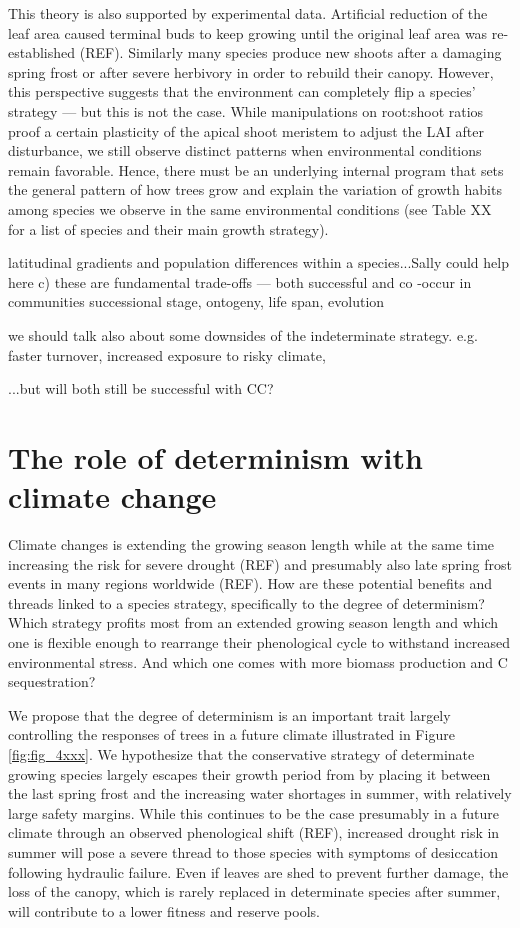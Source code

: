 \documentclass{article}
\begin{document}
This theory is also supported by experimental data. Artificial reduction of the leaf area caused terminal buds to keep growing until the original leaf area was re-established (REF). Similarly many species produce new shoots after a damaging spring frost or after severe herbivory in order to rebuild their canopy. However, this perspective suggests that the environment can completely flip a species' strategy --- but this is not the case. While manipulations on root:shoot ratios proof a certain plasticity of the apical shoot meristem to adjust the LAI after disturbance, we still observe distinct patterns when environmental conditions remain favorable. Hence, there must be an underlying internal program that sets the general pattern of how trees grow and explain the variation of growth habits among species we observe in the same environmental conditions (see Table XX for a list of species and their main growth strategy). 

latitudinal gradients and population differences within a species...Sally could help here
	c) these are fundamental trade-offs --- both successful and co -occur in communities
	successional stage, ontogeny, life span, evolution
	
	we should talk also about some downsides of the indeterminate strategy. e.g. faster turnover, increased exposure to risky climate, 
	
	...but will both still be successful with CC?
	
\section*{The role of determinism with climate change }
Climate changes is extending the growing season length while at the same time increasing the risk for severe drought (REF) and presumably also late spring frost events in many regions worldwide (REF). How are these potential benefits and threads linked to a species strategy, specifically to the degree of determinism? Which strategy profits most from an extended growing season length and which one is flexible enough to rearrange their phenological cycle to withstand increased environmental stress. And which one comes with more biomass production and C sequestration?

We propose that the degree of determinism is an important trait largely controlling the responses of trees in a future climate illustrated in Figure \ref{fig:fig_4xxx}. We hypothesize that the conservative strategy of determinate growing species largely escapes their growth period from by placing it between the last spring frost and the increasing water shortages in summer, with relatively large safety margins. While this continues to be the case presumably in a future climate through an observed phenological shift (REF), increased drought risk in summer will pose a severe thread to those species with symptoms of desiccation following hydraulic failure. Even if leaves are shed to prevent further damage, the loss of the canopy, which is rarely replaced in determinate species after summer, will contribute to a lower fitness and reserve pools. 
\end{document}
